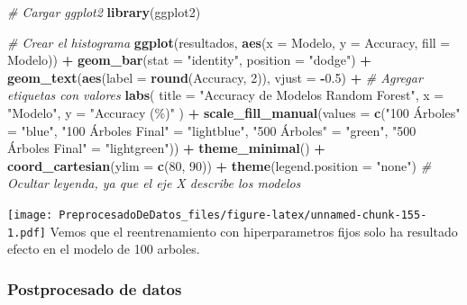 \documentclass[
]{article}
\newenvironment{Shaded}{\begin{snugshade}}{\end{snugshade}}
\newcommand{\AttributeTok}[1]{\textcolor[rgb]{0.13,0.29,0.53}{#1}}
\newcommand{\CommentTok}[1]{\textcolor[rgb]{0.56,0.35,0.01}{\textit{#1}}}
\newcommand{\DecValTok}[1]{\textcolor[rgb]{0.00,0.00,0.81}{#1}}
\newcommand{\FloatTok}[1]{\textcolor[rgb]{0.00,0.00,0.81}{#1}}
\newcommand{\FunctionTok}[1]{\textcolor[rgb]{0.13,0.29,0.53}{\textbf{#1}}}
\newcommand{\NormalTok}[1]{#1}
\newcommand{\OtherTok}[1]{\textcolor[rgb]{0.56,0.35,0.01}{#1}}
\newcommand{\SpecialCharTok}[1]{\textcolor[rgb]{0.81,0.36,0.00}{\textbf{#1}}}
\newcommand{\StringTok}[1]{\textcolor[rgb]{0.31,0.60,0.02}{#1}}
\begin{document}
\begin{Shaded}
\begin{Highlighting}[]
\CommentTok{\# Cargar ggplot2}
\FunctionTok{library}\NormalTok{(ggplot2)}

\CommentTok{\# Crear el histograma}
\FunctionTok{ggplot}\NormalTok{(resultados, }\FunctionTok{aes}\NormalTok{(}\AttributeTok{x =}\NormalTok{ Modelo, }\AttributeTok{y =}\NormalTok{ Accuracy, }\AttributeTok{fill =}\NormalTok{ Modelo)) }\SpecialCharTok{+}
  \FunctionTok{geom\_bar}\NormalTok{(}\AttributeTok{stat =} \StringTok{"identity"}\NormalTok{, }\AttributeTok{position =} \StringTok{"dodge"}\NormalTok{) }\SpecialCharTok{+}
  \FunctionTok{geom\_text}\NormalTok{(}\FunctionTok{aes}\NormalTok{(}\AttributeTok{label =} \FunctionTok{round}\NormalTok{(Accuracy, }\DecValTok{2}\NormalTok{)), }\AttributeTok{vjust =} \SpecialCharTok{{-}}\FloatTok{0.5}\NormalTok{) }\SpecialCharTok{+} \CommentTok{\# Agregar etiquetas con valores}
  \FunctionTok{labs}\NormalTok{(}
    \AttributeTok{title =} \StringTok{"Accuracy de Modelos Random Forest"}\NormalTok{,}
    \AttributeTok{x =} \StringTok{"Modelo"}\NormalTok{,}
    \AttributeTok{y =} \StringTok{"Accuracy (\%)"}
\NormalTok{  ) }\SpecialCharTok{+}
  \FunctionTok{scale\_fill\_manual}\NormalTok{(}\AttributeTok{values =} \FunctionTok{c}\NormalTok{(}\StringTok{"100 Árboles"} \OtherTok{=} \StringTok{"blue"}\NormalTok{, }\StringTok{"100 Árboles Final"} \OtherTok{=} \StringTok{"lightblue"}\NormalTok{, }
                               \StringTok{"500 Árboles"} \OtherTok{=} \StringTok{"green"}\NormalTok{, }\StringTok{"500 Árboles Final"} \OtherTok{=} \StringTok{"lightgreen"}\NormalTok{)) }\SpecialCharTok{+}
  \FunctionTok{theme\_minimal}\NormalTok{() }\SpecialCharTok{+}
  \FunctionTok{coord\_cartesian}\NormalTok{(}\AttributeTok{ylim =} \FunctionTok{c}\NormalTok{(}\DecValTok{80}\NormalTok{, }\DecValTok{90}\NormalTok{)) }\SpecialCharTok{+}
  \FunctionTok{theme}\NormalTok{(}\AttributeTok{legend.position =} \StringTok{"none"}\NormalTok{) }\CommentTok{\# Ocultar leyenda, ya que el eje X describe los modelos}
\end{Highlighting}
\end{Shaded}

\texttt{[image: PreprocesadoDeDatos\_files/figure-latex/unnamed-chunk-155-1.pdf]}
Vemos que el reentrenamiento con hiperparametros fijos solo ha resultado
efecto en el modelo de 100 arboles.

\hypertarget{postprocesado-de-datos}{%
\subsubsection{Postprocesado de datos}\label{postprocesado-de-datos}}
\end{document}
